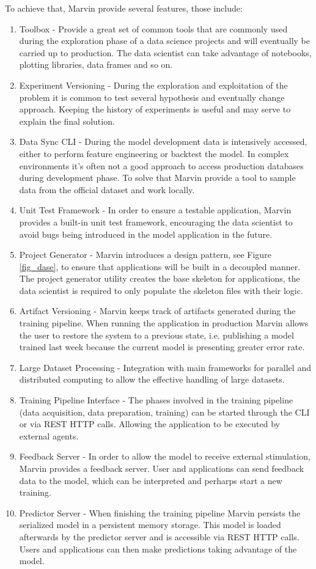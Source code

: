 \documentclass[twoside,11pt]{article}
\begin{document}
To achieve that, Marvin provide several features, those include:
\begin{enumerate}
    \item Toolbox - Provide a great set of common tools that are commonly used during the exploration phase of a data science projects and will eventually be carried up to production. The data scientist can take advantage of notebooks, plotting libraries, data frames and so on. 
    \item Experiment Versioning - During the exploration and exploitation of the problem it is common to test several hypothesis and eventually change approach. Keeping the history of experiments is useful and may serve to explain the final solution.
    \item Data Sync CLI - During the model development data is intensively accessed, either to perform feature engineering or backtest the model. In complex environments it's often not a good approach to access production databases during development phase. To solve that Marvin provide a tool to sample data from the official dataset and work locally.
    \item Unit Test Framework - In order to ensure a testable application, Marvin provides a built-in unit test framework, encouraging the data scientist to avoid bugs being introduced in the model application in the future.
    \item Project Generator - Marvin introduces a design pattern, see Figure \ref{fig_dase}, to ensure that applications will be built in a decoupled manner. The project generator utility creates the base skeleton for applications, the data scientist is required to only populate the skeleton files with their logic.
    \item Artifact Versioning - Marvin keeps track of artifacts generated during the training pipeline. When running the application in production Marvin allows the user to restore the system to a previous state, i.e. publishing a model trained last week because the current model is presenting greater error rate.
    \item Large Dataset Processing - Integration with main frameworks for parallel and distributed computing to allow the effective handling of large datasets.
    \item Training Pipeline Interface - The phases involved in the training pipeline (data acquisition, data preparation, training) can be started through the CLI or via REST HTTP calls. Allowing the application to be executed by external agents.
    \item Feedback Server - In order to allow the model to receive external stimulation, Marvin provides a feedback server. User and applications can send feedback data to the model, which can be interpreted and perharps start a new training.
    \item Predictor Server - When finishing the training pipeline Marvin persists the serialized model in a persistent memory storage. This model is loaded afterwards by the predictor server and is accessible via REST HTTP calls. Users and applications can then make predictions taking advantage of the model.
\end{enumerate}
\end{document}
